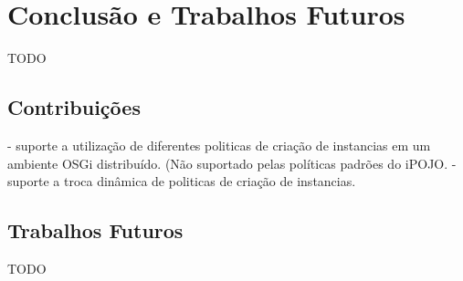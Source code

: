 \chapter{Conclusão e Trabalhos Futuros}
\label{ch:5}
TODO

\section{Contribuições}

- suporte a utilização de diferentes politicas de criação de instancias em um ambiente OSGi distribuído. (Não suportado pelas políticas padrões do iPOJO.
- suporte a troca dinâmica de politicas de criação de instancias.


\section{Trabalhos Futuros}
TODO